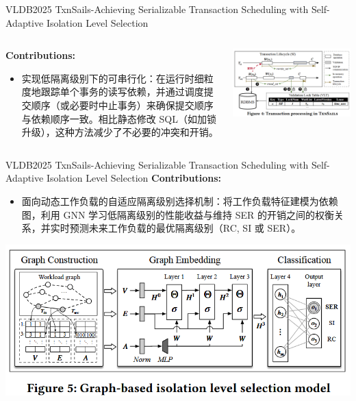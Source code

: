 
\begin{frame}{VLDB2025 TxnSails-Achieving Serializable Transaction Scheduling with Self-Adaptive Isolation Level Selection}
	\begin{columns}
		\begin{column}{0.5\textwidth}
			\textbf{Contributions: }
			\begin{itemize}
				\item 实现低隔离级别下的可串行化：在运行时细粒度地跟踪单个事务的读写依赖，并通过调度提交顺序（或必要时中止事务）来确保提交顺序与依赖顺序一致。相比静态修改 SQL（如加锁升级），这种方法减少了不必要的冲突和开销。
			\end{itemize}
		\end{column}
		\begin{column}{0.5\textwidth}
			\includegraphics[width=0.98\linewidth]{figs/TxnSails-txn-proc}
		\end{column}
	\end{columns}
\end{frame}

\begin{frame}{VLDB2025 TxnSails-Achieving Serializable Transaction Scheduling with Self-Adaptive Isolation Level Selection}
	\textbf{Contributions: }
	\begin{itemize}
		\item 面向动态工作负载的自适应隔离级别选择机制：将工作负载特征建模为依赖图，利用 GNN 学习低隔离级别的性能收益与维持 SER 的开销之间的权衡关系，并实时预测未来工作负载的最优隔离级别（RC, SI 或 SER）。
	\end{itemize}
	\includegraphics[width=0.8\linewidth]{figs/TxnSails-selection-model}
\end{frame}

